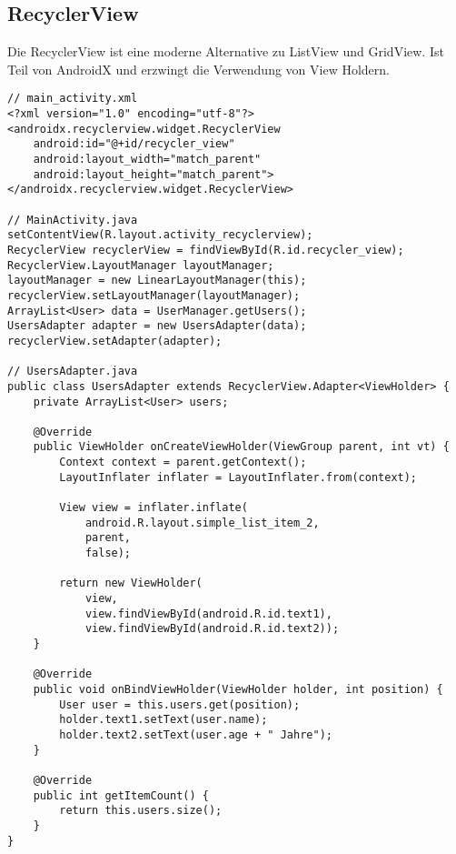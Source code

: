 \subsection{RecyclerView}
Die RecyclerView ist eine moderne Alternative zu ListView und GridView. Ist Teil von AndroidX und erzwingt die Verwendung von View Holdern.
\begin{lstlisting}
// main_activity.xml
<?xml version="1.0" encoding="utf-8"?>
<androidx.recyclerview.widget.RecyclerView
    android:id="@+id/recycler_view"
    android:layout_width="match_parent"
    android:layout_height="match_parent">
</androidx.recyclerview.widget.RecyclerView>

// MainActivity.java
setContentView(R.layout.activity_recyclerview);
RecyclerView recyclerView = findViewById(R.id.recycler_view);
RecyclerView.LayoutManager layoutManager;
layoutManager = new LinearLayoutManager(this);
recyclerView.setLayoutManager(layoutManager);
ArrayList<User> data = UserManager.getUsers();
UsersAdapter adapter = new UsersAdapter(data);
recyclerView.setAdapter(adapter);

// UsersAdapter.java
public class UsersAdapter extends RecyclerView.Adapter<ViewHolder> {
    private ArrayList<User> users;

    @Override
    public ViewHolder onCreateViewHolder(ViewGroup parent, int vt) {
        Context context = parent.getContext();
        LayoutInflater inflater = LayoutInflater.from(context);

        View view = inflater.inflate(
            android.R.layout.simple_list_item_2,
            parent,
            false);

        return new ViewHolder(
            view,
            view.findViewById(android.R.id.text1),
            view.findViewById(android.R.id.text2));
    }

    @Override
    public void onBindViewHolder(ViewHolder holder, int position) {
        User user = this.users.get(position);
        holder.text1.setText(user.name);
        holder.text2.setText(user.age + " Jahre");
    }

    @Override
    public int getItemCount() {
        return this.users.size();
    }
}
\end{lstlisting}